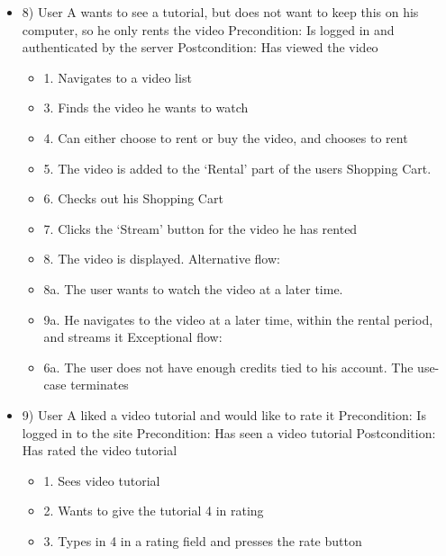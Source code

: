 \begin{itemize}
\item 8)
User A wants to see a tutorial, but does not want to keep this on his computer, so he only rents the video
\newline Precondition: Is logged in and authenticated by the server
\newline Postcondition: Has viewed the video
\begin{itemize}
    \item 1. Navigates to a video list
    \item 3. Finds the video he wants to watch
    \item 4. Can either choose to rent or buy the video, and chooses to rent
    \item 5. The video is added to the ‘Rental’ part of the users Shopping Cart.
    \item 6. Checks out his Shopping Cart
    \item 7. Clicks the ‘Stream’ button for the video he has rented
    \item 8. The video is displayed. 
\newline Alternative flow:
    \item 8a. The user wants to watch the video at a later time.
    \item 9a. He navigates to the video at a later time, within the rental period, and streams it
\newline Exceptional flow:
    \item 6a. The user does not have enough credits tied to his account. The use-case terminates 
\end{itemize}

\item 9)
User A liked a video tutorial and would like to rate it
\newline Precondition: Is logged in to the site
\newline Precondition: Has seen a video tutorial
\newline Postcondition: Has rated the video tutorial
\begin{itemize}
	\item 1. Sees video tutorial
    \item 2. Wants to give the tutorial 4 in rating
    \item 3. Types in 4 in a rating field and presses the rate button
\end{itemize}


\end{itemize}
